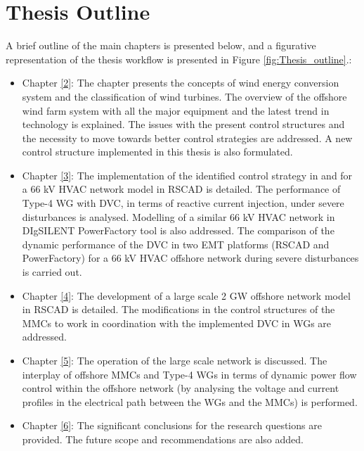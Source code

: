 \section{Thesis Outline}
A brief outline of the main chapters is presented below, and a figurative representation of the thesis workflow is presented in Figure \ref{fig:Thesis_outline}.:
\begin{itemize}
    \item Chapter \ref{2}: The chapter presents the concepts of wind energy conversion system and the classification of wind turbines. The overview of the offshore wind farm system with all the major equipment and the latest trend in technology is explained. The issues with the present control structures and the necessity to move towards better control strategies are addressed. A new control structure implemented in this thesis is also formulated.  
    
    \item Chapter \ref{3}: The implementation of the identified control strategy in \cite{korai_dynamic_2019} and \cite{sethi_real-time_nodate-new} for a 66 kV \gls{HVAC} network model in RSCAD is detailed. The performance of Type-4 \gls{WG} with \gls{DVC}, in terms of reactive current injection, under severe disturbances is analysed. Modelling of a similar 66 kV \gls{HVAC} network in DIgSILENT PowerFactory tool is also addressed. The comparison of the dynamic performance of the \gls{DVC} in two \gls{EMT} platforms (RSCAD and PowerFactory) for a 66 kV \gls{HVAC} offshore network during severe disturbances is carried out. 
    
    \item Chapter \ref{4}: The development of a large scale 2 GW offshore network model in RSCAD is detailed. The modifications in the control structures of the \gls{MMC}s to work in coordination with the implemented \gls{DVC} in \gls{WG}s are addressed.
    
    \item Chapter \ref{5}: The operation of the large scale network is discussed. The interplay of offshore \gls{MMC}s and Type-4 \gls{WG}s in terms of dynamic power flow control within the offshore network (by analysing the voltage and current profiles in the electrical path between the \gls{WG}s and the \gls{MMC}s) is performed. 
    
    \item Chapter \ref{6}: The significant conclusions for the research questions are provided. The future scope and recommendations are also added.
\end{itemize}

